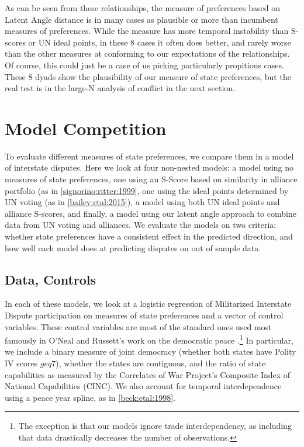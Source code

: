 As can be seen from these relationships, the measure of preferences based on Latent Angle distance is in many cases as plausible or more than incumbent measures of preferences. While the measure has more temporal instability than S-scores or UN ideal points, in these 8 cases it often does better, and rarely worse than the other measures at conforming to our expectations of the relationships. Of course, this could just be a case of us picking particularly propitious cases. These 8 dyads show the plausibility of our measure of state preferences, but the real test is in the large-N analysis of conflict in the next section.


\section*{Model Competition}

To evaluate different measures of state preferences, we compare them in a model of interstate disputes. Here we look at four non-nested models: a model using no measures of state preferences, one using an S-Score based on similarity in alliance portfolio (as in \ref{signorino:ritter:1999}, one using the ideal points determined by UN voting (as in \ref{bailey:etal:2015}), a model using both UN ideal points and alliance S-scores, and finally, a model using our latent angle approach to combine data from UN voting and alliances. We evaluate the models on two criteria: whether state preferences have a consistent effect in the predicted direction, and how well each model does at predicting disputes on out of sample data.

\subsection*{Data, Controls}

In each of these models, we look at a logistic regression of Militarized Interstate Dispute participation on measures of state preferences and a vector of control variables. These control variables are most of the standard ones used most famously in O'Neal and Russett's work on the democratic peace \citep{oneal:russett:1997}.\footnote{The exception is that our models ignore trade interdependency, as including that data drastically decreases the number of observations.} In particular, we include a binary measure of joint democracy (whether both states have Polity IV scores $geq 7$), whether the states are contiguous, and the ratio of state capabilities as measured by the Correlates of War Project's Composite Index of National Capabilities (CINC). We also account for temporal interdependence using a peace year spline, as in \ref{beck:etal:1998}. 

